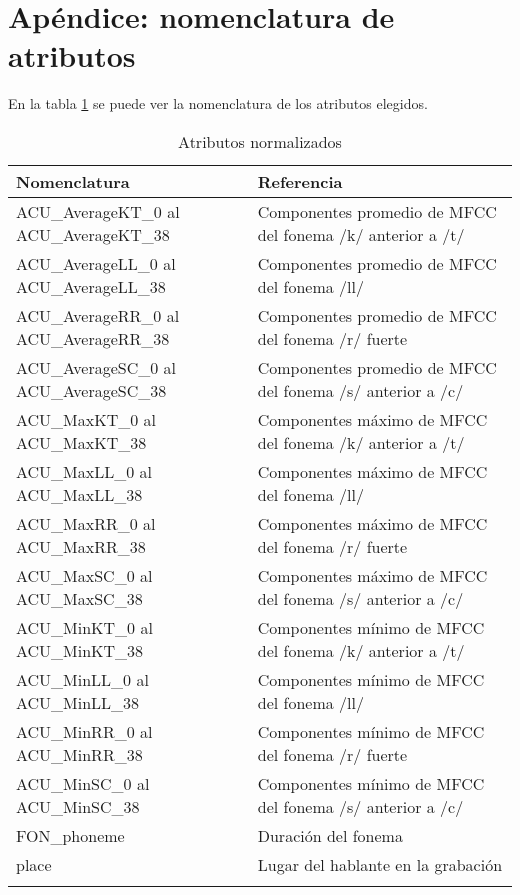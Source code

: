\chapter*{ {\small Apéndice: nomenclatura de atributos}}

\footnotesize

\begin{flushleft}
En la tabla \ref{tab:attr} se puede ver la nomenclatura de los atributos elegidos. 
\end{flushleft}

\centering
\begin{longtable}{| p{} | p{} |} 
\hline
\textbf{Nomenclatura}  & \textbf{Referencia}   \\ \hline
ACU\_AverageKT\_0 al ACU\_AverageKT\_38 & Componentes promedio de MFCC del fonema /k/ anterior a /t/\\ \hline
ACU\_AverageLL\_0 al ACU\_AverageLL\_38 & Componentes promedio de MFCC del fonema /ll/\\ \hline
ACU\_AverageRR\_0 al ACU\_AverageRR\_38 & Componentes promedio de MFCC del fonema /r/ fuerte\\ \hline
ACU\_AverageSC\_0 al ACU\_AverageSC\_38 & Componentes promedio de MFCC del fonema /s/ anterior a /c/\\ \hline
ACU\_MaxKT\_0 al ACU\_MaxKT\_38 & Componentes máximo de MFCC del fonema /k/ anterior a /t/\\ \hline
ACU\_MaxLL\_0 al ACU\_MaxLL\_38 & Componentes máximo de MFCC del fonema /ll/\\ \hline
ACU\_MaxRR\_0 al ACU\_MaxRR\_38 & Componentes máximo de MFCC del fonema /r/ fuerte\\ \hline
ACU\_MaxSC\_0 al ACU\_MaxSC\_38 & Componentes máximo de MFCC del fonema /s/ anterior a /c/\\ \hline
ACU\_MinKT\_0 al ACU\_MinKT\_38 & Componentes mínimo de MFCC del fonema /k/ anterior a /t/\\ \hline
ACU\_MinLL\_0 al ACU\_MinLL\_38 & Componentes mínimo de MFCC del fonema /ll/\\ \hline
ACU\_MinRR\_0 al ACU\_MinRR\_38 & Componentes mínimo de MFCC del fonema /r/ fuerte\\ \hline
ACU\_MinSC\_0 al ACU\_MinSC\_38 & Componentes mínimo de MFCC del fonema /s/ anterior a /c/ \\ \hline
FON\_phoneme & Duración del fonema\\ \hline
place & Lugar del hablante en la grabación\\ \hline
\caption{Atributos normalizados} 
\label{tab:attr}
\end{longtable}

